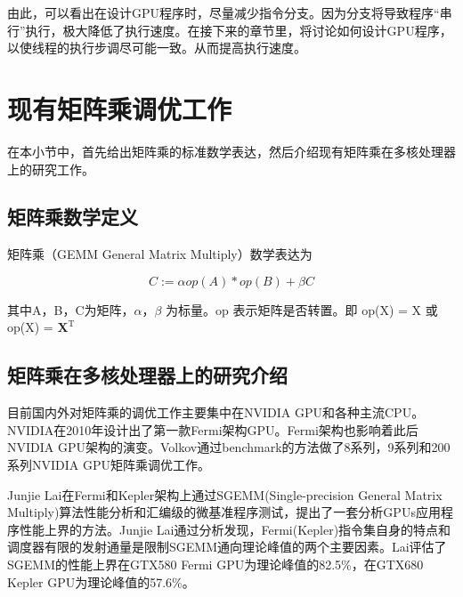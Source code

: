 由此，可以看出在设计GPU程序时，尽量减少指令分支。因为分支将导致程序“串行”执行，极大降低了执行速度。在接下来的章节里，将讨论如何设计GPU程序，以使线程的执行步调尽可能一致。从而提高执行速度。

\section{现有矩阵乘调优工作}
在本小节中，首先给出矩阵乘的标准数学表达，然后介绍现有矩阵乘在多核处理器上的研究工作。

\subsection{矩阵乘数学定义}
矩阵乘（GEMM General Matrix Multiply）数学表达为

\begin{equation}
	C:= \alpha op(A)*op(B) + \beta C
\end{equation}

其中A，B，C为矩阵，$\alpha$，$\beta$ 为标量。op 表示矩阵是否转置。即 op(X) = X 或 op(X) = $\mathbf{X}^\mathrm{T}$

\subsection{矩阵乘在多核处理器上的研究介绍}
目前国内外对矩阵乘的调优工作主要集中在NVIDIA GPU和各种主流CPU。NVIDIA在2010年设计出了第一款Fermi架构GPU。Fermi架构也影响着此后NVIDIA GPU架构的演变。Volkov通过benchmark的方法做了8系列，9系列和200系列NVIDIA GPU矩阵乘调优工作。

Junjie Lai在Fermi和Kepler架构上通过SGEMM(Single-precision General Matrix Multiply)算法性能分析和汇编级的微基准程序测试，提出了一套分析GPUs应用程序性能上界的方法。Junjie Lai通过分析发现，Fermi(Kepler)指令集自身的特点和调度器有限的发射通量是限制SGEMM通向理论峰值的两个主要因素。Lai评估了SGEMM的性能上界在GTX580 Fermi GPU为理论峰值的82.5\%，在GTX680 Kepler GPU为理论峰值的57.6\%。

